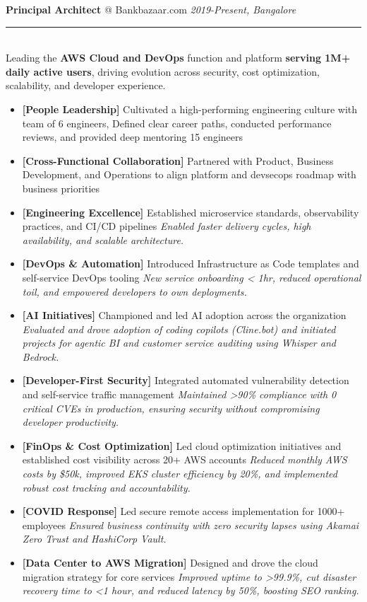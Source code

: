 \documentclass[11pt]{article}
\makeatletter
\newcommand{\roleheader}[3]{%
  {\large\sffamily\textbf{#1} @ #2} \hfill \textit{#3}\\[-0.3em]
  \color{myblue}\rule{\linewidth}{1pt}\\[0.5em]\color{bodytext}
}
\newenvironment{experiencebullets}{%
  \begin{itemize}[leftmargin=1.25em, itemsep=-0.25em]
    \renewcommand{\labelitemi}{\textbullet}
}{%
  \end{itemize}
}
\newenvironment{experience}[4]{%
  \roleheader{#1}{#2}{#3}%
  #4\vspace{0.5em}%
}{%
  \vspace{1em}
}
\newcommand{\expbullet}[3]{%
  \item \textbf{[#1]} {#2} \textrightarrow{} \textit{#3}%
}
\makeatother
\begin{document}
\begin{experience}{Principal Architect}{Bankbazaar.com}{2019-Present, Bangalore}{%
    Leading the \textbf{AWS Cloud and DevOps} function and platform \textbf{serving 1M+ daily active users}, driving evolution across security, cost optimization, scalability, and developer experience.%
  }

  \begin{experiencebullets}
    \item \textbf{[People Leadership] }{Cultivated a high-performing engineering culture with team of 6 engineers, Defined clear career paths, conducted performance reviews, and provided deep mentoring 15 engineers}{}

    \item \textbf{[Cross-Functional Collaboration] }{Partnered with Product, Business Development, and Operations to align platform and devsecops roadmap with business priorities}{}

    \expbullet{Engineering Excellence}{Established microservice standards, observability practices, and CI/CD pipelines}{Enabled faster delivery cycles, high availability, and scalable architecture.}

    \expbullet{DevOps \& Automation}{Introduced Infrastructure as Code templates and self-service DevOps tooling}{New service onboarding < 1hr, reduced operational toil, and empowered developers to own deployments.}

    \expbullet {AI Initiatives}{Championed and led AI adoption across the organization}
    {Evaluated and drove adoption of coding copilots (Cline.bot) and initiated projects for agentic BI and customer service auditing using Whisper and Bedrock.}

    \expbullet{Developer-First Security}{Integrated automated vulnerability detection and self-service traffic management}{Maintained >90\% compliance with 0 critical CVEs in production, ensuring security without compromising developer productivity.}

    \expbullet{FinOps \& Cost Optimization}{Led cloud optimization initiatives and established cost visibility across 20+ AWS accounts}{Reduced monthly AWS costs by \$50k, improved EKS cluster efficiency by 20\%, and implemented robust cost tracking and accountability.}

    \expbullet {COVID Response}{Led secure remote access implementation for 1000+ employees}
    {Ensured business continuity with zero security lapses using Akamai Zero Trust and HashiCorp Vault.}

    \expbullet {Data Center to AWS Migration}{Designed and drove the cloud migration strategy for core services}
    {Improved uptime to >99.9\%, cut disaster recovery time to <1 hour, and reduced latency by 50\%, boosting SEO ranking.}
  \end{experiencebullets}

\end{experience}
\end{document}
